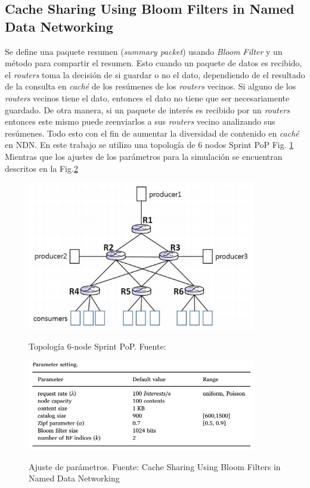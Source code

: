 \documentclass[12pt]{ociamthesis}  %
\begin{document}
\pagebreak


\subsection{Cache Sharing Using Bloom Filters in Named Data Networking \cite{mun2017cache}}

Se define una paquete resumen (\textit{summary packet}) usando \textit{Bloom Filter} y un método para compartir el resumen. Esto cuando un paquete de datos es recibido, el \textit{routers} toma la decisión de si guardar o no el dato, dependiendo de el resultado de la consulta en \textit{caché} de los resúmenes de los \textit{routers} vecinos. Si alguno de los \textit{routers} vecinos tiene el dato, entonces el dato no tiene que ser necesariamente guardado. De otra manera, si un paquete de interés es recibido por un \textit{routers} entonces este mismo puede reenviarlos a sus \textit{routers} vecino analizando sus resúmenes. Todo esto con el fin de aumentar la diversidad de contenido en \textit{caché} en NDN. En este trabajo se utilizo una topología de 6 nodos Sprint PoP Fig. \ref{Topologia_Sprint_PoP} Mientras que los ajustes de los parámetros para la simulación se encuentran descritos en la Fig.\ref{Tabla_paremetros}

	\begin{figure}[!htb]
		\centering
		\includegraphics[width=10cm]{Imagenes/Topologia_Sprint_PoP}\\
		\caption{Topología 6-node Sprint PoP. Fuente: \cite{Spring:2002:MIT:964725.633039}}
		\label{Topologia_Sprint_PoP}
	\end{figure}
	
		\begin{figure}[!htb]
			\centering
			\includegraphics[width=10cm]{Imagenes/Tabla_parametros}\\
			\caption{Ajuste de parámetros. Fuente: Cache Sharing Using Bloom Filters in Named Data Networking \cite{mun2017cache}}
			\label{Tabla_paremetros}
		\end{figure}
	
\end{document}
